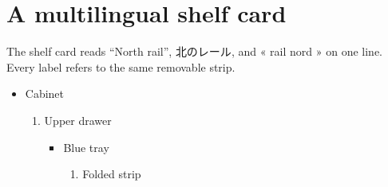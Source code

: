 \documentclass{article}
\begin{document}
\section*{A multilingual shelf card}

\sloppy The shelf card reads “North rail”, {\jp 北のレール}, and « rail nord » on one line. Every label refers to the same removable strip.
\begin{itemize}\item Cabinet
\begin{enumerate}\item Upper drawer
\begin{itemize}\item Blue tray
\begin{enumerate}\item Folded strip\end{enumerate}\end{itemize}\end{enumerate}\end{itemize}
\end{document}
